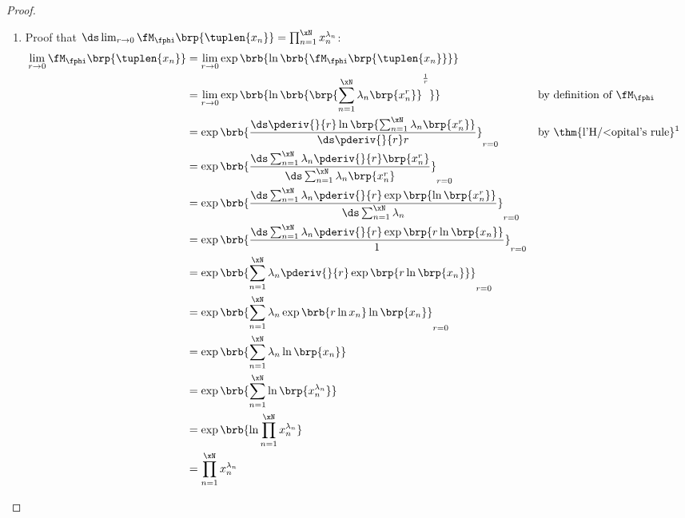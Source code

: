 \begin{proof}
\begin{enumerate}
  \item Proof that $\ds\lim_{r\to0} \fM_\fphi\brp{\tuplen{x_n}} = \prod_{n=1}^{\xN} x_n^{\lambda_n}$:
    \begin{align*}
      \lim_{r\to0} \fM_\fphi\brp{\tuplen{x_n}}
        &= \lim_{r\to0} \exp\brb{\ln\brb{\fM_\fphi\brp{\tuplen{x_n}}}}
      \\&= \lim_{r\to0} \exp\brb{\ln\brb{\brp{\sum_{n=1}^{\xN}\lambda_n\brp{x_n^r}}^\frac{1}{r}}}
        && \text{by definition of $\fM_\fphi$}
      \\&= \exp\brb{\frac{\ds\pderiv{}{r}\ln\brp{\sum_{n=1}^{\xN}\lambda_n\brp{x_n^r}}}{\ds\pderiv{}{r}r}}_{r=0}
        && \text{by \thm{l'H{/<o}pital's rule}\footnotemark}
      \\&= \exp\brb{\frac{\ds\sum_{n=1}^{\xN}\lambda_n\pderiv{}{r}\brp{x_n^r}}
                         {\ds\sum_{n=1}^{\xN}\lambda_n\brp{x_n^r}}
                   }_{r=0}
      \\&= \exp\brb{\frac{\ds\sum_{n=1}^{\xN}\lambda_n\pderiv{}{r}\exp\brp{\ln\brp{x_n^r}}}
                         {\ds\sum_{n=1}^{\xN}\lambda_n}
                   }_{r=0}
      \\&= \exp\brb{\frac{\ds\sum_{n=1}^{\xN}\lambda_n\pderiv{}{r}\exp\brp{r\ln\brp{x_n}}}
                         {1}
                   }_{r=0}
      \\&= \exp\brb{\sum_{n=1}^{\xN}\lambda_n\pderiv{}{r}\exp\brp{r\ln\brp{x_n}}
                   }_{r=0}
      \\&= \exp\brb{\sum_{n=1}^{\xN}\lambda_n\exp\brb{r\ln{x_n}}\ln\brp{x_n}
                   }_{r=0}
      \\&= \exp\brb{\sum_{n=1}^{\xN}\lambda_n\ln\brp{x_n}}
      \\&= \exp\brb{\sum_{n=1}^{\xN}\ln\brp{x_n^{\lambda_n}}}
      \\&= \exp\brb{\ln\prod_{n=1}^{\xN}x_n^{\lambda_n}}
      \\&= \prod_{n=1}^{\xN} x_n^{\lambda_n}
    \end{align*}
\end{enumerate}
\end{proof}

